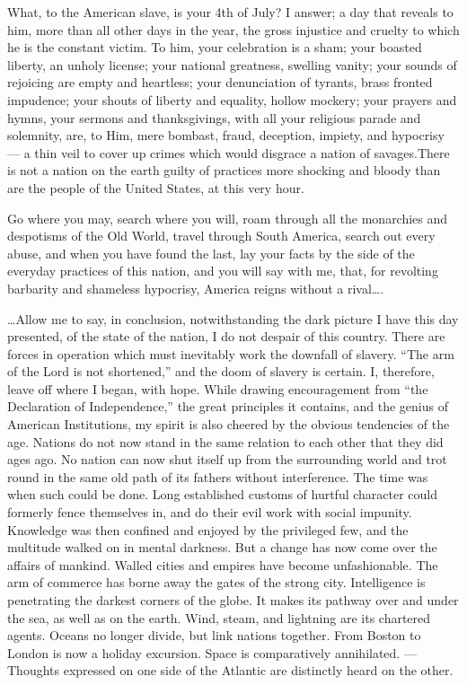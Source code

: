 \documentclass[a4paper]{amsbook}
\begin{document}
What, to the American slave, is your 4th of July? I answer; a day that reveals to him, more than all other days in the year, the gross injustice and cruelty to which he is the constant victim. To him, your celebration is a sham; your boasted liberty, an unholy license; your national greatness, swelling vanity; your sounds of rejoicing are empty and heartless; your denunciation of tyrants, brass fronted impudence; your shouts of liberty and equality, hollow mockery; your prayers and hymns, your sermons and thanksgivings, with all your religious parade and solemnity, are, to Him, mere bombast, fraud, deception, impiety, and hypocrisy — a thin veil to cover up crimes which would disgrace a nation of savages.There is not a nation on the earth guilty of practices more shocking and bloody than are the people of the United States, at this very hour.

Go where you may, search where you will, roam through all the monarchies and despotisms of the Old World, travel through South America, search out every abuse, and when you have found the last, lay your facts by the side of the everyday practices of this nation, and you will say with me, that, for revolting barbarity and shameless hypocrisy, America reigns without a rival….

…Allow me to say, in conclusion, notwithstanding the dark picture I have this day presented, of the state of the nation, I do not despair of this country. There are forces in operation which must inevitably work the downfall of slavery. “The arm of the Lord is not shortened,” and the doom of slavery is certain. I, therefore, leave off where I began, with hope. While drawing encouragement from “the Declaration of Independence,” the great principles it contains, and the genius of American Institutions, my spirit is also cheered by the obvious tendencies of the age. Nations do not now stand in the same relation to each other that they did ages ago. No nation can now shut itself up from the surrounding world and trot round in the same old path of its fathers without interference. The time was when such could be done. Long established customs of hurtful character could formerly fence themselves in, and do their evil work with social impunity. Knowledge was then confined and enjoyed by the privileged few, and the multitude walked on in mental darkness. But a change has now come over the affairs of mankind. Walled cities and empires have become unfashionable. The arm of commerce has borne away the gates of the strong city. Intelligence is penetrating the darkest corners of the globe. It makes its pathway over and under the sea, as well as on the earth. Wind, steam, and lightning are its chartered agents. Oceans no longer divide, but link nations together. From Boston to London is now a holiday excursion. Space is comparatively annihilated. — Thoughts expressed on one side of the Atlantic are distinctly heard on the other.
\end{document}
